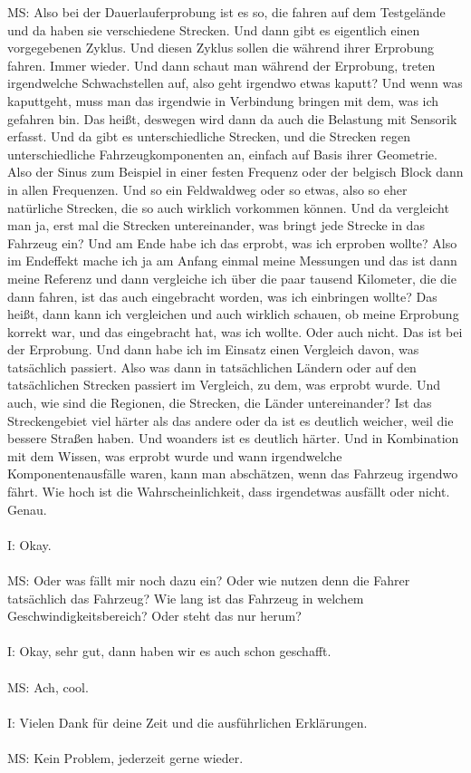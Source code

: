\begin{linenumbers}
MS: Also bei der Dauerlauferprobung ist es so, die fahren auf dem Testgelände und da haben sie verschiedene Strecken. Und dann gibt es eigentlich einen vorgegebenen Zyklus. Und diesen Zyklus sollen die während ihrer Erprobung fahren. Immer wieder. Und dann schaut man während der Erprobung, treten irgendwelche Schwachstellen auf, also geht irgendwo etwas kaputt? Und wenn was kaputtgeht, muss man das irgendwie in Verbindung bringen mit dem, was ich gefahren bin. Das heißt, deswegen wird dann da auch die Belastung mit Sensorik erfasst. Und da gibt es unterschiedliche Strecken, und die Strecken regen unterschiedliche Fahrzeugkomponenten an, einfach auf Basis ihrer Geometrie. Also der Sinus zum Beispiel in einer festen Frequenz oder der belgisch Block dann in allen Frequenzen. Und so ein Feldwaldweg oder so etwas, also so eher natürliche Strecken, die so auch wirklich vorkommen können. Und da vergleicht man ja, erst mal die Strecken untereinander, was bringt jede Strecke in das Fahrzeug ein? Und am Ende habe ich das erprobt, was ich erproben wollte? Also im Endeffekt mache ich ja am Anfang einmal meine Messungen und das ist dann meine Referenz und dann vergleiche ich über die paar tausend Kilometer, die die dann fahren, ist das auch eingebracht worden, was ich einbringen wollte? Das heißt, dann kann ich vergleichen und auch wirklich schauen, ob meine Erprobung korrekt war, und das eingebracht hat, was ich wollte. Oder auch nicht. Das ist bei der Erprobung. Und dann habe ich im Einsatz einen Vergleich davon, was tatsächlich passiert. Also was dann in tatsächlichen Ländern oder auf den tatsächlichen Strecken passiert im Vergleich, zu dem, was erprobt wurde. Und auch, wie sind die Regionen, die Strecken, die Länder untereinander? Ist das Streckengebiet viel härter als das andere oder da ist es deutlich weicher, weil die bessere Straßen haben. Und woanders ist es deutlich härter. Und in Kombination mit dem Wissen, was erprobt wurde und wann irgendwelche Komponentenausfälle waren, kann man abschätzen, wenn das Fahrzeug irgendwo fährt. Wie hoch ist die Wahrscheinlichkeit, dass irgendetwas ausfällt oder nicht. Genau.\\\\
I: Okay.\\\\
MS: Oder was fällt mir noch dazu ein? Oder wie nutzen denn die Fahrer tatsächlich das Fahrzeug? Wie lang ist das Fahrzeug in welchem Geschwindigkeitsbereich? Oder steht das nur herum?\\\\
I: Okay, sehr gut, dann haben wir es auch schon geschafft.\\\\
MS: Ach, cool.\\\\
I: Vielen Dank für deine Zeit und die ausführlichen Erklärungen.\\\\
MS: Kein Problem, jederzeit gerne wieder.
\end{linenumbers}